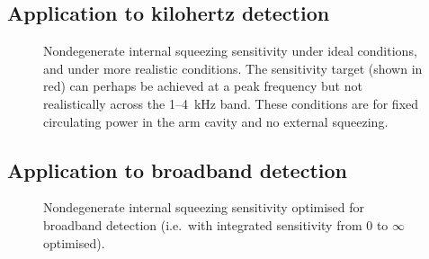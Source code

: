 

\subsection{Application to kilohertz detection}

\begin{figure}
	\centering
	\caption{Nondegenerate internal squeezing sensitivity under ideal conditions, and under more realistic conditions. The sensitivity target (shown in red) can perhaps be achieved at a peak frequency but not realistically across the 1--4~kHz band. These conditions are for fixed circulating power in the arm cavity and no external squeezing.}
	\label{fig:}
\end{figure}







\subsection{Application to broadband detection}

\begin{figure}
	\centering
	\caption{Nondegenerate internal squeezing sensitivity optimised for broadband detection (i.e.\ with integrated sensitivity from 0 to $\infty$ optimised).}
	\label{fig:}
\end{figure}

